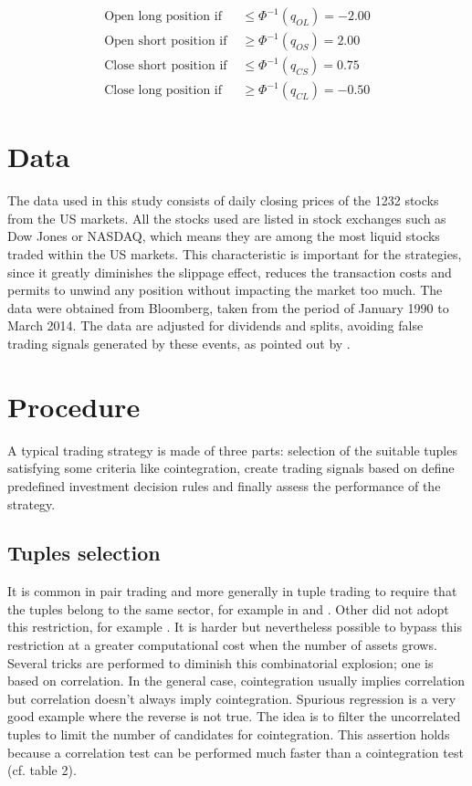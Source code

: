 \documentclass[11pt,a4,twosided,singlespacing,titlepagenumber=on]{scrreprt}
\numberwithin{equation}{chapter} %
\theoremstyle{remark}
\begin{document}
\begin{align*}
\text{Open long position if } &\leq \Phi^{-1}(q_{OL}) = -2.00\\
\text{Open short position if } &\geq \Phi^{-1}(q_{OS}) = 2.00\\
\text{Close short position if } &\leq \Phi^{-1}(q_{CS}) = 0.75\\
\text{Close long position if } &\geq \Phi^{-1}(q_{CL}) = -0.50
\end{align*}


\section{Data}
The data used in this study consists of daily closing prices of the 1232 stocks from the US markets. All the stocks used are listed in stock exchanges such as Dow Jones or NASDAQ, which means they are among the most liquid stocks traded within the US markets. This characteristic is important for the strategies, since it greatly diminishes the slippage effect, reduces the transaction costs and permits to unwind any position without impacting the market too much. The data were obtained from Bloomberg, taken from the period of January 1990 to March 2014. The data are adjusted for dividends and splits, avoiding false trading signals generated by these events, as pointed out by \cite{broussard2012}.

\section{Procedure}
A typical trading strategy is made of three parts: selection of the suitable tuples satisfying some criteria like cointegration, create trading signals based on define predefined investment decision rules and finally assess the performance of the strategy.

\subsection{Tuples selection}
It is common in pair trading and more generally in tuple trading to require that the tuples belong to the same sector, for example in \cite{chan2009} and \cite{dunis2010}. Other did not adopt this restriction, for example \cite{caldeira2013}. It is harder but nevertheless possible to bypass this restriction at a greater computational cost when the number of assets grows. Several tricks are performed to diminish this combinatorial explosion; one is based on correlation. In the general case, cointegration usually implies correlation but correlation doesn't always imply cointegration. Spurious regression is a very good example where the reverse is not true. The idea is to filter the uncorrelated tuples to limit the number of candidates for cointegration. This assertion holds because a correlation test can be performed much faster than a cointegration test (cf. table 2).
\end{document}
